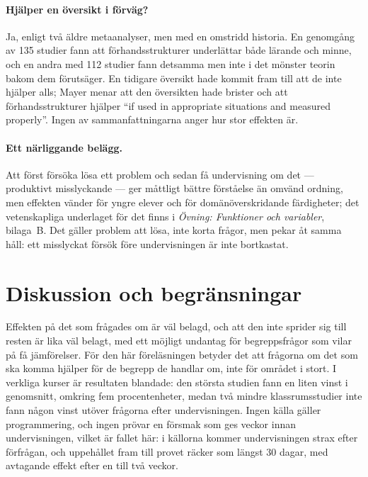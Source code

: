\paragraph{Hjälper en översikt i förväg?}
Ja, enligt två äldre metaanalyser, men med en omstridd historia.  En
genomgång av 135 studier fann att förhandsstrukturer underlättar både
lärande och minne\autocite{Luiten1980Organizers}, och en andra med 112
studier fann detsamma men inte i det mönster teorin bakom dem
förutsäger\autocite{Stone1983Organizers}.  En tidigare översikt hade
kommit fram till att de inte hjälper alls; Mayer menar att den
översikten hade brister och att förhandsstrukturer hjälper \enquote{if
used in appropriate situations and measured
properly}\autocite{Mayer1979Organizers}.  Ingen av sammanfattningarna
anger hur stor effekten är.

\paragraph{Ett närliggande belägg.}
Att först försöka lösa ett problem och sedan få undervisning om det ---
produktivt misslyckande --- ger måttligt bättre förståelse än omvänd
ordning, men effekten vänder för yngre elever och för
domänöverskridande färdigheter\autocite{SinhaKapur2021}; det
vetenskapliga underlaget för det finns i \emph{Övning: Funktioner och
variabler}, bilaga~B.  Det gäller problem att lösa, inte korta frågor,
men pekar åt samma håll: ett misslyckat försök före undervisningen är
inte bortkastat.

\section{Diskussion och begränsningar}
\label{sec:recap-pretest-diskussion}

Effekten på det som frågades om är väl belagd, och att den inte sprider
sig till resten är lika väl belagt, med ett möjligt undantag för
begreppsfrågor som vilar på få jämförelser.  För den här föreläsningen betyder
det att frågorna om det som ska komma hjälper för de begrepp de handlar
om, inte för området i stort.  I verkliga kurser är resultaten blandade:
den största studien fann en liten vinst i genomsnitt, omkring fem
procentenheter, medan två mindre
klassrumsstudier inte fann någon vinst utöver frågorna efter
undervisningen.  Ingen källa gäller programmering, och ingen prövar en
försmak som ges veckor innan undervisningen, vilket är fallet här: i
källorna kommer undervisningen strax efter förfrågan, och uppehållet
fram till provet räcker som längst 30 dagar, med avtagande effekt efter
en till två veckor.

